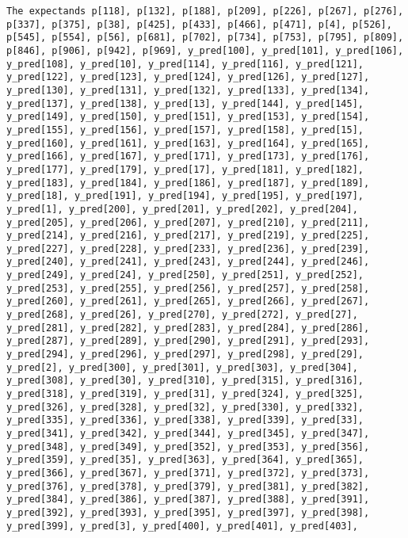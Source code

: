\documentclass[
  letterpaper,
  DIV=11,
  numbers=noendperiod]{scrartcl}
\begin{document}
\begin{verbatim}
The expectands p[118], p[132], p[188], p[209], p[226], p[267], p[276],
p[337], p[375], p[38], p[425], p[433], p[466], p[471], p[4], p[526],
p[545], p[554], p[56], p[681], p[702], p[734], p[753], p[795], p[809],
p[846], p[906], p[942], p[969], y_pred[100], y_pred[101], y_pred[106],
y_pred[108], y_pred[10], y_pred[114], y_pred[116], y_pred[121],
y_pred[122], y_pred[123], y_pred[124], y_pred[126], y_pred[127],
y_pred[130], y_pred[131], y_pred[132], y_pred[133], y_pred[134],
y_pred[137], y_pred[138], y_pred[13], y_pred[144], y_pred[145],
y_pred[149], y_pred[150], y_pred[151], y_pred[153], y_pred[154],
y_pred[155], y_pred[156], y_pred[157], y_pred[158], y_pred[15],
y_pred[160], y_pred[161], y_pred[163], y_pred[164], y_pred[165],
y_pred[166], y_pred[167], y_pred[171], y_pred[173], y_pred[176],
y_pred[177], y_pred[179], y_pred[17], y_pred[181], y_pred[182],
y_pred[183], y_pred[184], y_pred[186], y_pred[187], y_pred[189],
y_pred[18], y_pred[191], y_pred[194], y_pred[195], y_pred[197],
y_pred[1], y_pred[200], y_pred[201], y_pred[202], y_pred[204],
y_pred[205], y_pred[206], y_pred[207], y_pred[210], y_pred[211],
y_pred[214], y_pred[216], y_pred[217], y_pred[219], y_pred[225],
y_pred[227], y_pred[228], y_pred[233], y_pred[236], y_pred[239],
y_pred[240], y_pred[241], y_pred[243], y_pred[244], y_pred[246],
y_pred[249], y_pred[24], y_pred[250], y_pred[251], y_pred[252],
y_pred[253], y_pred[255], y_pred[256], y_pred[257], y_pred[258],
y_pred[260], y_pred[261], y_pred[265], y_pred[266], y_pred[267],
y_pred[268], y_pred[26], y_pred[270], y_pred[272], y_pred[27],
y_pred[281], y_pred[282], y_pred[283], y_pred[284], y_pred[286],
y_pred[287], y_pred[289], y_pred[290], y_pred[291], y_pred[293],
y_pred[294], y_pred[296], y_pred[297], y_pred[298], y_pred[29],
y_pred[2], y_pred[300], y_pred[301], y_pred[303], y_pred[304],
y_pred[308], y_pred[30], y_pred[310], y_pred[315], y_pred[316],
y_pred[318], y_pred[319], y_pred[31], y_pred[324], y_pred[325],
y_pred[326], y_pred[328], y_pred[32], y_pred[330], y_pred[332],
y_pred[335], y_pred[336], y_pred[338], y_pred[339], y_pred[33],
y_pred[341], y_pred[342], y_pred[344], y_pred[345], y_pred[347],
y_pred[348], y_pred[349], y_pred[352], y_pred[353], y_pred[356],
y_pred[359], y_pred[35], y_pred[363], y_pred[364], y_pred[365],
y_pred[366], y_pred[367], y_pred[371], y_pred[372], y_pred[373],
y_pred[376], y_pred[378], y_pred[379], y_pred[381], y_pred[382],
y_pred[384], y_pred[386], y_pred[387], y_pred[388], y_pred[391],
y_pred[392], y_pred[393], y_pred[395], y_pred[397], y_pred[398],
y_pred[399], y_pred[3], y_pred[400], y_pred[401], y_pred[403],

\end{verbatim}
\end{document}
